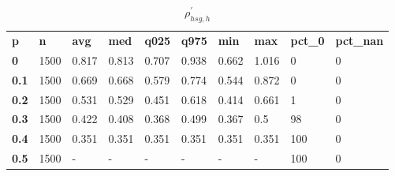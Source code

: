 \begin{table}[h]
 \centering 
\footnotesize
\caption{$\rho_{hsg,h}^\prime $}
\label{tab:alphahsgh}
\begin{tabular}[h]{| l l l l l l l l l l|
    } \hline
\textbf{ p} & \textbf{ n} & \textbf{ avg} & \textbf{ med} & \textbf{ q025} & \textbf{ q975} & \textbf{ min} & \textbf{ max} & \textbf{ pct\_0} & \textbf{ pct\_nan}
           \\
  \textbf{  0} & 1500 & 0.817 & 0.813 & 0.707 & 0.938 & 0.662 & 1.016 &   0 & 0
           \\
  \textbf{0.1} & 1500 & 0.669 & 0.668 & 0.579 & 0.774 & 0.544 & 0.872 &   0 & 0
           \\
  \textbf{0.2} & 1500 & 0.531 & 0.529 & 0.451 & 0.618 & 0.414 & 0.661 &   1 & 0
           \\
  \textbf{0.3} & 1500 & 0.422 & 0.408 & 0.368 & 0.499 & 0.367 &   0.5 &  98 & 0
           \\
  \textbf{0.4} & 1500 & 0.351 & 0.351 & 0.351 & 0.351 & 0.351 & 0.351 & 100 & 0
           \\
  \textbf{0.5} & 1500 & - & - & - & - & - & - & 100 & 0
           \\
 \hline \end{tabular}
 \end{table}
